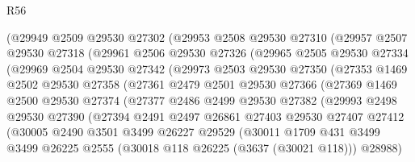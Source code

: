 \begin{lexlean}{R56}
\begin{coremodule}
          (@29949
            @2509
            @29530
            @27302
            (@29953
              @2508
              @29530
              @27310
              (@29957
                @2507
                @29530
                @27318
                (@29961
                  @2506
                  @29530
                  @27326
                  (@29965
                    @2505
                    @29530
                    @27334
                    (@29969
                      @2504
                      @29530
                      @27342
                      (@29973
                        @2503
                        @29530
                        @27350
                        (@27353
                          @1469
                          @2502
                          @29530
                          @27358
                          (@27361
                            @2479
                            @2501
                            @29530
                            @27366
                            (@27369
                              @1469
                              @2500
                              @29530
                              @27374
                              (@27377
                                @2486
                                @2499
                                @29530
                                @27382
                                (@29993
                                  @2498
                                  @29530
                                  @27390
                                  (@27394
                                    @2491
                                    @2497
                                    @26861
                                    @27403
                                    @29530
                                    @27407
                                    @27412
                                    (@30005
                                      @2490
                                      @3501
                                      @3499
                                      @26227
                                      @29529
                                      (@30011
                                        @1709
                                        @431
                                        @3499
                                        @3499
                                        @26225
                                        @2555
                                        (@30018 @118 @26225 (@3637 (@30021 @118)))
                                        @28988)

\end{coremodule}
\end{lexlean}
